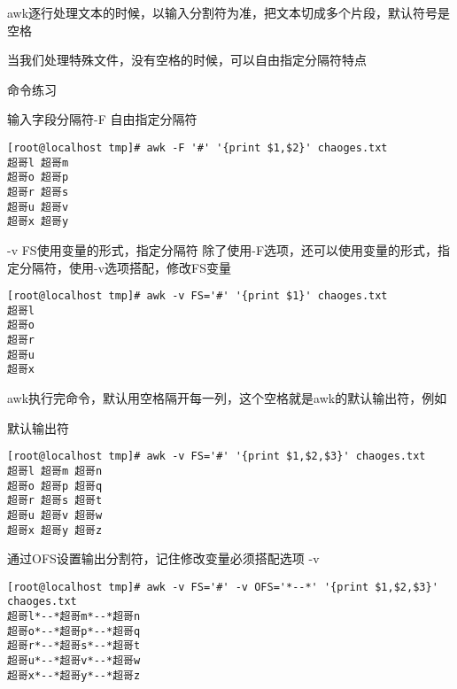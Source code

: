 awk逐行处理文本的时候，以输入分割符为准，把文本切成多个片段，默认符号是空格

当我们处理特殊文件，没有空格的时候，可以自由指定分隔符特点
\begin{ascolorbox10}{命令练习}
\begin{ascboxJ}{输入字段分隔符-F 自由指定分隔符}
		\begin{lstlisting}[style=linux]
[root@localhost tmp]# awk -F '#' '{print $1,$2}' chaoges.txt
超哥l 超哥m
超哥o 超哥p
超哥r 超哥s
超哥u 超哥v
超哥x 超哥y
		\end{lstlisting}
\end{ascboxJ}
	
\begin{ascboxJ}{-v FS使用变量的形式，指定分隔符}
除了使用-F选项，还可以使用变量的形式，指定分隔符，使用-v选项搭配，修改FS变量
		\begin{lstlisting}[style=linux]
[root@localhost tmp]# awk -v FS='#' '{print $1}' chaoges.txt
超哥l
超哥o
超哥r
超哥u
超哥x
		\end{lstlisting}
\end{ascboxJ}
	
awk执行完命令，默认用空格隔开每一列，这个空格就是awk的默认输出符，例如
	\begin{ascboxJ}{默认输出符}
		\begin{lstlisting}[style=linux]
			[root@localhost tmp]# awk -v FS='#' '{print $1,$2,$3}' chaoges.txt
超哥l 超哥m 超哥n
超哥o 超哥p 超哥q
超哥r 超哥s 超哥t
超哥u 超哥v 超哥w
超哥x 超哥y 超哥z
		\end{lstlisting}
	\end{ascboxJ}
	
	\begin{ascboxJ}{通过OFS设置输出分割符，记住修改变量必须搭配选项 -v}
		\begin{lstlisting}[style=linux]
[root@localhost tmp]# awk -v FS='#' -v OFS='*--*' '{print $1,$2,$3}' chaoges.txt
超哥l*--*超哥m*--*超哥n
超哥o*--*超哥p*--*超哥q
超哥r*--*超哥s*--*超哥t
超哥u*--*超哥v*--*超哥w
超哥x*--*超哥y*--*超哥z
		\end{lstlisting}
	\end{ascboxJ}
\end{ascolorbox10}

